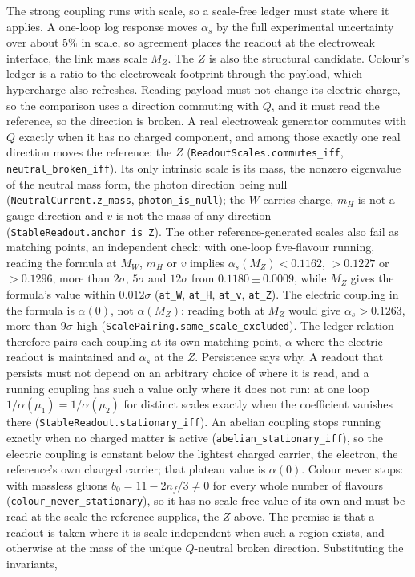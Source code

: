 The strong coupling runs with scale, so a scale-free ledger must state where it applies. A one-loop log response moves $\alpha_s$ by the full experimental uncertainty over about $5\%$ in scale, so agreement places the readout at the electroweak interface, the link mass scale $M_Z$. The $Z$ is also the structural candidate. Colour's ledger is a ratio to the electroweak footprint through the payload, which hypercharge also refreshes. Reading payload must not change its electric charge, so the comparison uses a direction commuting with $Q$, and it must read the reference, so the direction is broken. A real electroweak generator commutes with $Q$ exactly when it has no charged component, and among those exactly one real direction moves the reference: the $Z$ (\texttt{ReadoutScales.commutes\_iff}, \texttt{neutral\_broken\_iff}). Its only intrinsic scale is its mass, the nonzero eigenvalue of the neutral mass form, the photon direction being null (\texttt{NeutralCurrent.z\_mass}, \texttt{photon\_is\_null}); the $W$ carries charge, $m_H$ is not a gauge direction and $v$ is not the mass of any direction (\texttt{StableReadout.anchor\_is\_Z}). The other reference-generated scales also fail as matching points, an independent check: with one-loop five-flavour running, reading the formula at $M_W$, $m_H$ or $v$ implies $\alpha_s(M_Z)<0.1162$, $>0.1227$ or $>0.1296$, more than $2\sigma$, $5\sigma$ and $12\sigma$ from $0.1180\pm0.0009$, while $M_Z$ gives the formula's value within $0.012\sigma$ (\texttt{at\_W}, \texttt{at\_H}, \texttt{at\_v}, \texttt{at\_Z}). The electric coupling in the formula is $\alpha(0)$, not $\alpha(M_Z)$: reading both at $M_Z$ would give $\alpha_s>0.1263$, more than $9\sigma$ high (\texttt{ScalePairing.same\_scale\_excluded}). The ledger relation therefore pairs each coupling at its own matching point, $\alpha$ where the electric readout is maintained and $\alpha_s$ at the $Z$. Persistence says why. A readout that persists must not depend on an arbitrary choice of where it is read, and a running coupling has such a value only where it does not run: at one loop $1/\alpha(\mu_1)=1/\alpha(\mu_2)$ for distinct scales exactly when the coefficient vanishes there (\texttt{StableReadout.stationary\_iff}). An abelian coupling stops running exactly when no charged matter is active (\texttt{abelian\_stationary\_iff}), so the electric coupling is constant below the lightest charged carrier, the electron, the reference's own charged carrier; that plateau value is $\alpha(0)$. Colour never stops: with massless gluons $b_0=11-2n_f/3\neq0$ for every whole number of flavours (\texttt{colour\_never\_stationary}), so it has no scale-free value of its own and must be read at the scale the reference supplies, the $Z$ above. The premise is that a readout is taken where it is scale-independent when such a region exists, and otherwise at the mass of the unique $Q$-neutral broken direction. Substituting the invariants,

